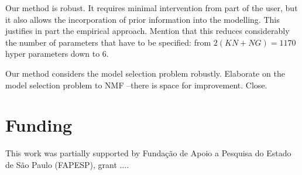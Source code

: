 \documentclass{bioinfo}
\begin{document}
Our method is robust. It requires minimal intervention from part of
the user, but it also allows the incorporation of prior information
into the modelling. This justifies in part the empirical
approach. Mention that this reduces considerably the number of
parameters that have to be specified: from $2(KN+NG)=1170$ hyper
parameters down to 6.


Our method considers the model selection problem robustly. Elaborate
on the model selection problem to NMF --there is space for
improvement. Close.

\section*{Funding}
This work was partially supported by Funda\c{c}\~ao de Apoio a
Pesquisa do Estado de S\~ao Paulo (FAPESP), grant $\ldots$. 
\vspace*{-12pt}


 

\end{document}

